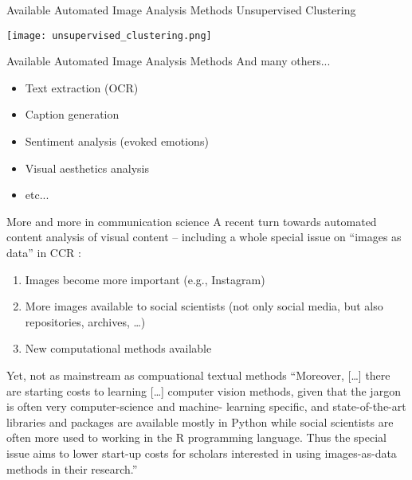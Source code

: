   \begin{frame}{Available Automated Image Analysis Methods}
  \large{Unsupervised Clustering}
  
  \texttt{[image: unsupervised\_clustering.png]} \centering
  
  \end{frame}
  
  \begin{frame}{Available Automated Image Analysis Methods}
  \large{And many others...}
  
  \begin{itemize}
      \item Text extraction (OCR)
      \item Caption generation
      \item Sentiment analysis (evoked emotions)
      \item Visual aesthetics analysis
      \item etc...
  \end{itemize}
  
  \end{frame}

  

\begin{frame}{More and more in communication science}
  A recent turn towards automated content analysis of visual content -- including a whole special issue on ``images as data'' in CCR \parencite{Casas2022}:
 
  \begin{enumerate}
  \item Images become more important (e.g., Instagram)
  \item More images available to social scientists (not only social media, but also repositories, archives, \ldots)
  \item New computational methods available
  \end{enumerate}
\end{frame}



\begin{frame}{Yet, not as mainstream as compuational textual methods}
``Moreover, [\ldots] there are
starting costs to learning [\ldots]  computer vision
methods, given that the jargon is often very computer-science and machine-
learning specific, and state-of-the-art libraries and packages are available
mostly in Python while social scientists are often more used to working
in the R programming language. Thus
the special issue aims to lower
start-up costs for scholars interested in using images-as-data methods in
their research.''
\parencite[p.~3]{Casas2022}
\end{frame}

